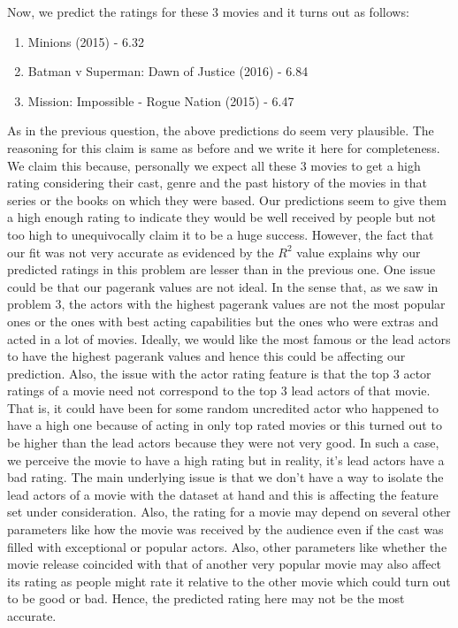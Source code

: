 \documentclass{article}
\begin{document}
Now, we predict the ratings for these 3 movies and it turns out as follows:
\begin{enumerate}
 \item 
 Minions (2015) - 6.32
 \item
 Batman v Superman: Dawn of Justice (2016) - 6.84
 \item
 Mission: Impossible - Rogue Nation (2015) - 6.47
 
\end{enumerate}
As in the previous question, the above predictions do seem very plausible. The reasoning for this claim is same as before
and we write it here for completeness.
We claim this because, personally we expect all these 3 movies
to get a high rating considering their cast, genre and the past history of the movies in that series or the books on which
they were based. Our predictions seem to give them a high enough rating to indicate they would be well received by people 
but not too high to unequivocally claim it to be a huge success.
However, the fact that our fit was not very accurate as evidenced by the $R^2$ value explains why our predicted ratings
in this problem are lesser than in the previous one. One issue could be that our pagerank values are not ideal. In the sense that,
as we saw in problem 3, the actors with the highest pagerank values are not the most popular ones or the ones with best
acting capabilities but the ones who were extras and acted in a lot of movies. Ideally, we would like the most famous
or the lead actors to have the highest pagerank values and hence this could be affecting our prediction.
Also, the issue with the actor rating feature is that the top 3 actor ratings
 of a movie need not correspond to the top 3 lead actors of that movie. That is, it could have been for some random uncredited 
 actor who happened to have a high one because of acting in only top rated movies 
 or this turned out to be higher than the lead actors because they were not very good.
 In such a case, we perceive the movie to have a high rating but in reality, it's lead actors have a bad rating. The main underlying 
 issue is that we don't have a way to isolate the lead actors of a movie with the dataset at hand and this is affecting the 
 feature set under consideration.
Also, the rating for a movie may depend on several other parameters 
like how the movie was received by the audience even if the cast was filled with exceptional or popular actors. Also, other
parameters like whether the movie release coincided with that of another very popular movie may also affect its rating
as people might rate it relative to the other movie which could turn out to be good or bad. Hence, the predicted rating here
may not be the most accurate.
\end{document}
